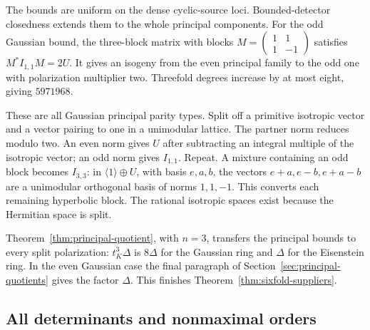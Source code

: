 The bounds are uniform on the dense cyclic-source loci. Bounded-detector closedness extends them to the whole principal components. For the odd Gaussian bound, the three-block matrix with blocks $M=\left(\begin{smallmatrix}1&1\\1&-1\end{smallmatrix}\right)$ satisfies $M^*I_{1,1}M=2U$. It gives an isogeny from the even principal family to the odd one with polarization multiplier two. Threefold degrees increase by at most eight, giving $5971968$.

These are all Gaussian principal parity types. Split off a primitive isotropic vector and a vector pairing to one in a unimodular lattice. The partner norm reduces modulo two. An even norm gives $U$ after subtracting an integral multiple of the isotropic vector; an odd norm gives $I_{1,1}$. Repeat. A mixture containing an odd block becomes $I_{3,3}$: in $\langle1\rangle\oplus U$, with basis $e,a,b$, the vectors $e+a,e-b,e+a-b$ are a unimodular orthogonal basis of norms $1,1,-1$. This converts each remaining hyperbolic block. The rational isotropic spaces exist because the Hermitian space is split.

Theorem~\ref{thm:principal-quotient}, with $n=3$, transfers the principal bounds to every split polarization: $t_K^3\Delta$ is $8\Delta$ for the Gaussian ring and $\Delta$ for the Eisenstein ring. In the even Gaussian case the final paragraph of Section~\ref{sec:principal-quotients} gives the factor $\Delta$. This finishes Theorem~\ref{thm:sixfold-suppliers}.

\subsection{All determinants and nonmaximal orders}

